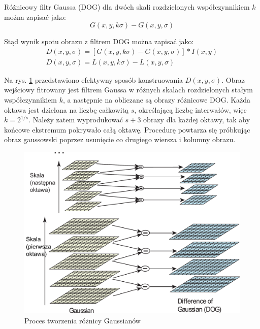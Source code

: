 Różnicowy filtr Gaussa (DOG) dla dwóch skali rozdzielonych współczynnikiem $k$ można zapisać jako:
\begin{equation} 
\label{sift_dog} 
G(x, y, k\sigma) - G(x, y, \sigma) 
\end{equation} 

Stąd wynik spotu obrazu z filtrem DOG można zapisać jako:
\begin{equation} 
\label{sift_splot} 
	\begin{gathered}
		D(x, y, \sigma) = [G(x, y, k\sigma) - G(x, y, \sigma)] \ast I(x, y) \\
		D(x, y, \sigma) = L(x, y, k\sigma) - L(x, y, \sigma)
	\end{gathered}
\end{equation}

Na rys. \ref{fig:sift-gaussian-to-dog} przedstawiono efektywny sposób konstruowania $D(x, y, \sigma)$. Obraz wejściowy fitrowany jest filtrem Gaussa w różnych skalach rozdzielonych stałym współczynnikiem $k$, a następnie na obliczane są obrazy różnicowe DOG. Każda oktawa jest dzielona na liczbę całkowitą $s$, określającą liczbę interwałów, więc $k=2^{1/s}$. Należy zatem wyprodukować $s+3$ obrazy dla każdej oktawy, tak aby końcowe ekstremum pokrywało całą oktawę. Procedurę powtarza się próbkując obraz gaussowski poprzez usunięcie co drugiego wiersza i kolumny obrazu.\cite{LOWE04}

\begin{figure}[h]
	\centering
	\includegraphics[scale=0.4]{graphics/01_podstawy_teoretyczne/sift-gaussian-to-dog.pdf}
	\caption{Proces tworzenia różnicy Gaussianów \cite{LOWE04}}
	\label{fig:sift-gaussian-to-dog}
\end{figure}

